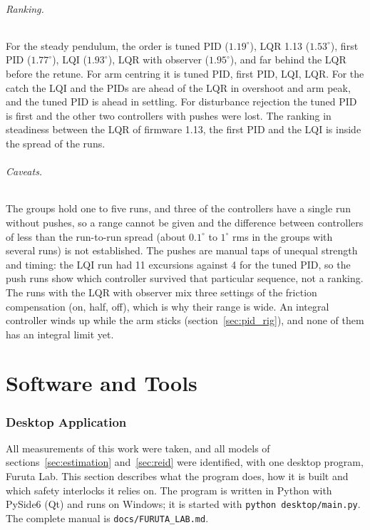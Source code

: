 \documentclass[a4paper,11pt]{article}
\begin{document}
\paragraph{Ranking.} For the steady pendulum, the order is tuned PID ($1.19^\circ$), LQR 1.13 ($1.53^\circ$), first PID ($1.77^\circ$), LQI ($1.93^\circ$), LQR with observer ($1.95^\circ$), and far behind the LQR before the retune. For arm centring it is tuned PID, first PID, LQI, LQR. For the catch the LQI and the PIDs are ahead of the LQR in overshoot and arm peak, and the tuned PID is ahead in settling. For disturbance rejection the tuned PID is first and the other two controllers with pushes were lost. The ranking in steadiness between the LQR of firmware 1.13, the first PID and the LQI is inside the spread of the runs.

\paragraph{Caveats.} The groups hold one to five runs, and three of the controllers have a single run without pushes, so a range cannot be given and the difference between controllers of less than the run-to-run spread (about $0.1^\circ$ to $1^\circ$ rms in the groups with several runs) is not established. The pushes are manual taps of unequal strength and timing: the LQI run had 11 excursions against 4 for the tuned PID, so the push runs show which controller survived that particular sequence, not a ranking. The runs with the LQR with observer mix three settings of the friction compensation (on, half, off), which is why their range is wide. An integral controller winds up while the arm sticks (section~\ref{sec:pid_rig}), and none of them has an integral limit yet.

\part{Software and Tools}

\section{Desktop Application}
\label{sec:app}
All measurements of this work were taken, and all models of sections~\ref{sec:estimation} and~\ref{sec:reid} were identified, with one desktop program, Furuta Lab. This section describes what the program does, how it is built and which safety interlocks it relies on. The program is written in Python with PySide6 (Qt) and runs on Windows; it is started with \texttt{python desktop/main.py}. The complete manual is \nolinkurl{docs/FURUTA_LAB.md}.
\end{document}
